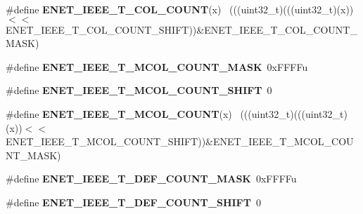 \begin{DoxyCompactItemize}
\item 
\hypertarget{group___e_n_e_t___register___masks_gab799b994ce921c24ffd15d1857e22ccc}{}\#define {\bfseries E\+N\+E\+T\+\_\+\+I\+E\+E\+E\+\_\+\+T\+\_\+C\+O\+L\+\_\+\+C\+O\+U\+N\+T}(x)                            ~(((uint32\+\_\+t)(((uint32\+\_\+t)(x))$<$$<$E\+N\+E\+T\+\_\+\+I\+E\+E\+E\+\_\+\+T\+\_\+C\+O\+L\+\_\+\+C\+O\+U\+N\+T\+\_\+\+S\+H\+I\+F\+T))\&E\+N\+E\+T\+\_\+\+I\+E\+E\+E\+\_\+\+T\+\_\+C\+O\+L\+\_\+\+C\+O\+U\+N\+T\+\_\+\+M\+A\+S\+K)\label{group___e_n_e_t___register___masks_gab799b994ce921c24ffd15d1857e22ccc}

\item 
\hypertarget{group___e_n_e_t___register___masks_ga8c5aa3e3b3754724a33b871ec266dfae}{}\#define {\bfseries E\+N\+E\+T\+\_\+\+I\+E\+E\+E\+\_\+\+T\+\_\+\+M\+C\+O\+L\+\_\+\+C\+O\+U\+N\+T\+\_\+\+M\+A\+S\+K}~0x\+F\+F\+F\+Fu\label{group___e_n_e_t___register___masks_ga8c5aa3e3b3754724a33b871ec266dfae}

\item 
\hypertarget{group___e_n_e_t___register___masks_gafc71cbe43a3a04af9ab56efe38f08b82}{}\#define {\bfseries E\+N\+E\+T\+\_\+\+I\+E\+E\+E\+\_\+\+T\+\_\+\+M\+C\+O\+L\+\_\+\+C\+O\+U\+N\+T\+\_\+\+S\+H\+I\+F\+T}~0\label{group___e_n_e_t___register___masks_gafc71cbe43a3a04af9ab56efe38f08b82}

\item 
\hypertarget{group___e_n_e_t___register___masks_gadd5f38b7961609b958976116a538fdf4}{}\#define {\bfseries E\+N\+E\+T\+\_\+\+I\+E\+E\+E\+\_\+\+T\+\_\+\+M\+C\+O\+L\+\_\+\+C\+O\+U\+N\+T}(x)                            ~(((uint32\+\_\+t)(((uint32\+\_\+t)(x))$<$$<$E\+N\+E\+T\+\_\+\+I\+E\+E\+E\+\_\+\+T\+\_\+\+M\+C\+O\+L\+\_\+\+C\+O\+U\+N\+T\+\_\+\+S\+H\+I\+F\+T))\&E\+N\+E\+T\+\_\+\+I\+E\+E\+E\+\_\+\+T\+\_\+\+M\+C\+O\+L\+\_\+\+C\+O\+U\+N\+T\+\_\+\+M\+A\+S\+K)\label{group___e_n_e_t___register___masks_gadd5f38b7961609b958976116a538fdf4}

\item 
\hypertarget{group___e_n_e_t___register___masks_gaa51a7b5a53afb1d47cba1d900f9bf34f}{}\#define {\bfseries E\+N\+E\+T\+\_\+\+I\+E\+E\+E\+\_\+\+T\+\_\+\+D\+E\+F\+\_\+\+C\+O\+U\+N\+T\+\_\+\+M\+A\+S\+K}~0x\+F\+F\+F\+Fu\label{group___e_n_e_t___register___masks_gaa51a7b5a53afb1d47cba1d900f9bf34f}

\item 
\hypertarget{group___e_n_e_t___register___masks_gabbce06689e842f4caf2a19b2df8893c6}{}\#define {\bfseries E\+N\+E\+T\+\_\+\+I\+E\+E\+E\+\_\+\+T\+\_\+\+D\+E\+F\+\_\+\+C\+O\+U\+N\+T\+\_\+\+S\+H\+I\+F\+T}~0\label{group___e_n_e_t___register___masks_gabbce06689e842f4caf2a19b2df8893c6}


\end{DoxyCompactItemize}
